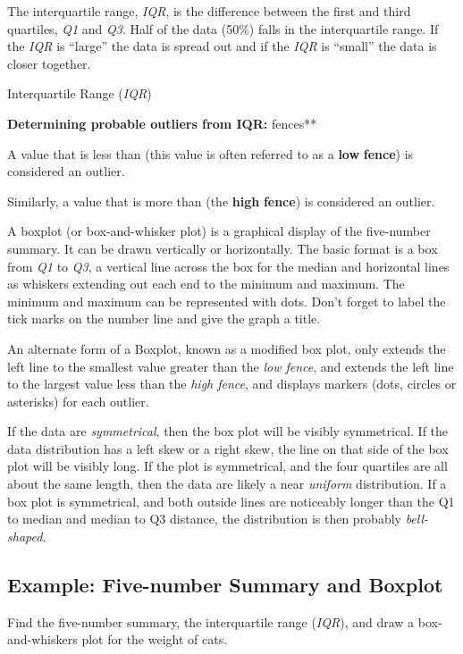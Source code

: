 \documentclass[]{book}
\begin{document}
The interquartile range, \emph{IQR}, is the difference between the first and third quartiles, \emph{Q1} and \emph{Q3}. Half of the data (50\%) falls in the interquartile range. If the \emph{IQR} is ``large'' the data is spread out and if the \emph{IQR} is ``small'' the data is closer together.

Interquartile Range (\emph{IQR})

\textbf{Determining probable outliers from IQR: }fences**

A value that is less than (this value is often referred to as a \textbf{low} \textbf{fence}) is considered an outlier.

Similarly, a value that is more than (the \textbf{high} \textbf{fence}) is considered an outlier.

A boxplot (or box-and-whisker plot) is a graphical display of the five-number summary. It can be drawn vertically or horizontally. The basic format is a box from \emph{Q1} to \emph{Q3}, a vertical line across the box for the median and horizontal lines as whiskers extending out each end to the minimum and maximum. The minimum and maximum can be represented with dots. Don't forget to label the tick marks on the number line and give the graph a title.

An alternate form of a Boxplot, known as a modified box plot, only extends the left line to the smallest value greater than the \emph{low fence}, and extends the left line to the largest value less than
the \emph{high fence}, and displays markers (dots, circles or asterisks) for each outlier.

If the data are \emph{symmetrical}, then the box plot will be visibly symmetrical. If the data distribution has a left skew or a right skew, the line on that side of the box plot will be visibly long. If the plot is symmetrical, and the four quartiles are all about the same length, then the data are likely a near \emph{uniform} distribution. If a box plot is symmetrical, and both outside lines are noticeably longer than the Q1 to median and median to Q3 distance, the distribution is then probably
\emph{bell-shaped.}

\hypertarget{example-five-number-summary-and-boxplot}{%
\subsection{Example: Five-number Summary and Boxplot}\label{example-five-number-summary-and-boxplot}}

Find the five-number summary, the interquartile range (\emph{IQR}), and draw a box-and-whiskers plot for the weight of cats.
\end{document}
